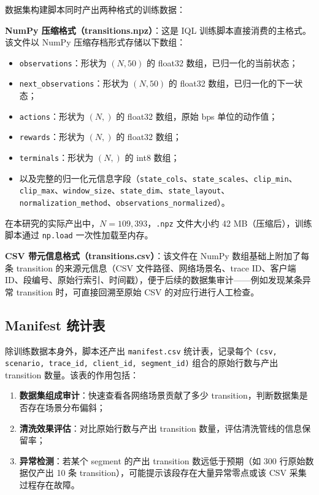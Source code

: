 数据集构建脚本同时产出两种格式的训练数据：

\textbf{NumPy 压缩格式（transitions.npz）}：这是 IQL 训练脚本直接消费的主格式。该文件以 NumPy 压缩存档形式存储以下数组：

\begin{itemize}
    \item \texttt{observations}：形状为 $(N, 50)$ 的 float32 数组，已归一化的当前状态；
    \item \texttt{next\_observations}：形状为 $(N, 50)$ 的 float32 数组，已归一化的下一状态；
    \item \texttt{actions}：形状为 $(N,)$ 的 float32 数组，原始 bps 单位的动作值；
    \item \texttt{rewards}：形状为 $(N,)$ 的 float32 数组；
    \item \texttt{terminals}：形状为 $(N,)$ 的 int8 数组；
    \item 以及完整的归一化元信息字段（\texttt{state\_cols}、\texttt{state\_scales}、\texttt{clip\_min}、\texttt{clip\_max}、\texttt{window\_size}、\texttt{state\_dim}、\texttt{state\_layout}、\texttt{normalization\_method}、\texttt{observations\_normalized}）。
\end{itemize}

在本研究的实际产出中，$N = 109,393$，\texttt{.npz} 文件大小约 42 MB（压缩后），训练脚本通过 \texttt{np.load} 一次性加载至内存。

\textbf{CSV 带元信息格式（transitions.csv）}：该文件在 NumPy 数组基础上附加了每条 transition 的来源元信息（CSV 文件路径、网络场景名、trace ID、客户端 ID、段编号、原始行索引、时间戳），便于后续的数据集审计——例如发现某条异常 transition 时，可直接回溯至原始 CSV 的对应行进行人工检查。

\subsection{Manifest 统计表}

除训练数据本身外，脚本还产出 \texttt{manifest.csv} 统计表，记录每个 \texttt{(csv, scenario, trace\_id, client\_id, segment\_id)} 组合的原始行数与产出 transition 数量。该表的作用包括：

\begin{enumerate}
    \item \textbf{数据集组成审计}：快速查看各网络场景贡献了多少 transition，判断数据集是否存在场景分布偏斜；
    \item \textbf{清洗效果评估}：对比原始行数与产出 transition 数量，评估清洗管线的信息保留率；
    \item \textbf{异常检测}：若某个 segment 的产出 transition 数远低于预期（如 300 行原始数据仅产出 10 条 transition），可能提示该段存在大量异常零点或该 CSV 采集过程存在故障。
\end{enumerate}


